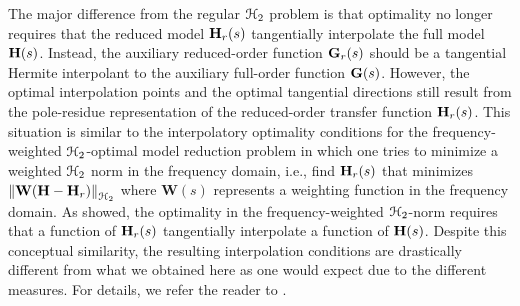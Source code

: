 \documentclass[twocolumn]{autart}
\begin{document}
 The major difference from the regular $\EuScript{H}_2$ problem is that  optimality no longer requires that the reduced model $\mathbf{H}_r(s)$ tangentially interpolate the full model $\mathbf{H}(s)$. Instead, the auxiliary reduced-order function $\mathbf{G}_r(s)$ should be a tangential Hermite interpolant to the auxiliary  full-order  function $\mathbf{G}(s)$. However, the optimal interpolation points and the optimal tangential directions still result from the pole-residue representation of the reduced-order transfer function $\mathbf{H}_r(s)$. This situation is  similar to the interpolatory optimality conditions for the  frequency-weighted $\EuScript{H}_2$-optimal model reduction problem in which  one tries to minimize a weighted $\EuScript{H}_2$ norm in the frequency domain, i.e.,
find $\mathbf{H}_r(s)$ that minimizes $ \left\lVert \mathbf{W} ( \mathbf{H} - \mathbf{H}_r) \right\rVert_{\EuScript{H}_2}$ where $\mathbf{W}(s)$ represents a weighting function in the frequency domain. As \cite{breiten2013near} showed, the optimality  
in the frequency-weighted $\EuScript{H}_2$-norm requires that a function of $\mathbf{H}_r(s)$ tangentially interpolate
a function of  $\mathbf{H}(s)$. Despite this  conceptual similarity, the resulting interpolation conditions are drastically different from what we obtained here as one would expect due to the different measures. For details, we refer the reader to  \cite{breiten2013near}.
\end{document}
